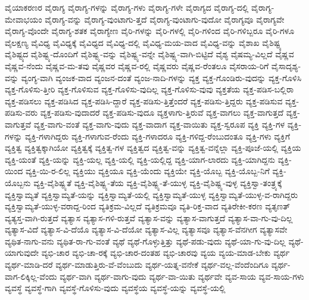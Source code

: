 {ವೈಯಾಕರಣರ
ವೈರಾಗ್ಯ
ವೈರಾಗ್ಯ-ಗಳನ್ನು
ವೈರಾಗ್ಯ-ಗಳು
ವೈರಾಗ್ಯ-ಗಳೇ
ವೈರಾಗ್ಯದ
ವೈರಾಗ್ಯ-ದಲ್ಲಿ
ವೈರಾಗ್ಯ-ಮೇವಾಭಯಂ
ವೈರಾಗ್ಯ-ವನ್ನು
ವೈರಾಗ್ಯ-ವುಂಟಾಗು-ತ್ತದೆ
ವೈರಾಗ್ಯ-ವುಂಟಾಗು-ವುದೋ
ವೈರಾಗ್ಯವೂ
ವೈರಾಗ್ಯವೇ
ವೈರಾಗ್ಯ-ವೊಂದೇ
ವೈರಾಗ್ಯ-ಶತಕ
ವೈರಾಗ್ಯೇಣ
ವೈರಿ-ಗಳನ್ನು
ವೈರಿ-ಗಳಲ್ಲಿ
ವೈರಿ-ಗಳಿಂದ
ವೈರಿ-ಗಳಿಬ್ಬರೂ
ವೈರಿ-ಗಳೂ
ವೈಲಕ್ಷಣ್ಯ
ವೈವಿಧ್ಯ
ವೈವಿಧ್ಯಕ್ಕೆ
ವೈವಿಧ್ಯದ
ವೈವಿಧ್ಯ-ದಲ್ಲಿ
ವೈವಿಧ್ಯ-ಮಯ-ವಾದ
ವೈವಿಧ್ಯ-ವನ್ನು
ವೈಶಾಖ
ವೈಶಿಷ್ಟ್ಯ
ವೈಶಿಷ್ಟ್ಯದ
ವೈಶಿಷ್ಟ್ಯ-ದೊಂದಿಗೆ
ವೈಶಿಷ್ಟ್ಯ-ವನ್ನು
ವೈಶಿಷ್ಟ್ಯ-ವನ್ನೇ
ವೈಶಿಷ್ಟ್ಯ-ವಾಗಿ-ಬಿಟ್ಟಿದೆ
ವೈಶ್ಯ
ವೈಷಮ್ಯ-ವಿಲ್ಲದೆ
ವೈಷ್ಣವ
ವೈಷ್ಣವ-ನೆಂದು
ವೈಷ್ಣವ-ಮ-ತವು
ವೈಷ್ಣವರ
ವೈಷ್ಣವ-ರಲ್ಲಿ
ವೈಷ್ಣವರು
ವೈಷ್ಣವ-ರೆಂತಲೂ
ವೈಸರಾಯ-ರಿಗೆ
ವೈಸಾದೃಶ್ಯ-ವನ್ನು
ವ್ಯಂಗ್ಯ-ವಾಗಿ
ವ್ಯಂಜಕ-ವಾದ
ವ್ಯಂಜನ-ದಂತೆ
ವ್ಯಂಜ-ನಾದಿ-ಗಳನ್ನು
ವ್ಯಕ್ತ
ವ್ಯಕ್ತ-ಗೊಂಡಿರು-ವುದನ್ನು
ವ್ಯಕ್ತ-ಗೊಳಿಸಿ
ವ್ಯಕ್ತ-ಗೊಳಿಸು-ತ್ತೀರಿ
ವ್ಯಕ್ತ-ಗೊಳಿಸುವ
ವ್ಯಕ್ತ-ಗೊಳಿಸು-ವುದಿಲ್ಲ
ವ್ಯಕ್ತ-ಗೊಳಿಸು-ವುವು
ವ್ಯಕ್ತತೆಯ
ವ್ಯಕ್ತ-ಪಡಿಸ-ಬಲ್ಲಿರಾ
ವ್ಯಕ್ತ-ಪಡಿಸಲು
ವ್ಯಕ್ತ-ಪಡಿಸಿದ
ವ್ಯಕ್ತ-ಪಡಿಸಿ-ದ್ದಾರೆ
ವ್ಯಕ್ತ-ಪಡಿಸು-ತ್ತಿತ್ತೆಂದರೆ
ವ್ಯಕ್ತ-ಪಡಿಸು-ತ್ತಿದ್ದರು
ವ್ಯಕ್ತ-ಪಡಿಸುವ
ವ್ಯಕ್ತ-ಪಡಿಸು-ವರು
ವ್ಯಕ್ತ-ಪಡಿಸು-ವುದಾದರೆ
ವ್ಯಕ್ತ-ಪಡಿಸು-ವುದೂ
ವ್ಯಕ್ತಳಾಗು-ತ್ತಿರುವೆ
ವ್ಯಕ್ತ-ವಾಗಲು
ವ್ಯಕ್ತ-ವಾಗುತ್ತದೆ
ವ್ಯಕ್ತ-ವಾಗುತ್ತವೆ
ವ್ಯಕ್ತ-ವಾಗು-ವಂತೆ
ವ್ಯಕ್ತ-ವಾಗು-ವುದು
ವ್ಯಕ್ತ-ವಾದಾಗ
ವ್ಯಕ್ತ-ವಾಯಿತು
ವ್ಯಕ್ತ-ಸ್ವರೂಪ
ವ್ಯಕ್ತಿ
ವ್ಯಕ್ತಿ-ಗಳ
ವ್ಯಕ್ತಿ-ಗಳನ್ನು
ವ್ಯಕ್ತಿ-ಗಳಾಗಿದ್ದರು
ವ್ಯಕ್ತಿ-ಗಳಾಗುವ-ರೆಂದು
ವ್ಯಕ್ತಿ-ಗಳಾದರೂ
ವ್ಯಕ್ತಿ-ಗಳಿದ್ದ-ರೆಂಬುದಂತೂ
ವ್ಯಕ್ತಿ-ಗಳು
ವ್ಯಕ್ತಿಗೆ
ವ್ಯಕ್ತಿತ್ವ
ವ್ಯಕ್ತಿತ್ವಕ್ಕಾಗಿಯೋ
ವ್ಯಕ್ತಿತ್ವಕ್ಕೆ
ವ್ಯಕ್ತಿತ್ವ-ಗಳ
ವ್ಯಕ್ತಿತ್ವದ
ವ್ಯಕ್ತಿತ್ವ-ವನ್ನು
ವ್ಯಕ್ತಿತ್ವ-ವನ್ನೆಲ್ಲಾ
ವ್ಯಕ್ತಿ-ಪೂಜೆ-ಯಲ್ಲಿ
ವ್ಯಕ್ತಿಯ
ವ್ಯಕ್ತಿ-ಯಂತೆ
ವ್ಯಕ್ತಿ-ಯನ್ನು
ವ್ಯಕ್ತಿ-ಯಲ್ಲ
ವ್ಯಕ್ತಿ-ಯಲ್ಲಿ
ವ್ಯಕ್ತಿ-ಯಲ್ಲಿದ್ದ
ವ್ಯಕ್ತಿ-ಯಾಗ-ಲಾರದು
ವ್ಯಕ್ತಿ-ಯಾಗಿದ್ದನು
ವ್ಯಕ್ತಿ-ಯಿಂದ
ವ್ಯಕ್ತಿ-ಯಿ-ರ-ಲಿಲ್ಲ
ವ್ಯಕ್ತಿಯು
ವ್ಯಕ್ತಿಯೂ
ವ್ಯಕ್ತಿ-ಯೆಂದು
ವ್ಯಕ್ತಿಯೇ
ವ್ಯಕ್ತಿ-ಯೊಬ್ಬ
ವ್ಯಕ್ತಿ-ಯೊಬ್ಬ-ನಿಗೆ
ವ್ಯಕ್ತಿ-ಯೊಬ್ಬನು
ವ್ಯಕ್ತಿ-ವೈಶಿಷ್ಟ್ಯತೆ
ವ್ಯಕ್ತಿ-ವೈಶಿಷ್ಟ್ಯ-ತೆಯ
ವ್ಯಕ್ತಿ-ವೈಶಿಷ್ಟ್ಯ-ತೆ-ಯುಳ್ಳ
ವ್ಯಕ್ತಿ-ವೈಶಿಷ್ಟ್ಯ-ವುಳ್ಳ
ವ್ಯಕ್ತಿಸ್ವಾ-ತಂತ್ರ್ಯಕ್ಕೆ
ವ್ಯಕ್ತಿಸ್ವಾಮ್ಯತೆ
ವ್ಯಕ್ತಿಸ್ವಾಮ್ಯತೆ-ಯನ್ನು
ವ್ಯಕ್ತಿಸ್ವಾಮ್ಯತೆ-ಯಲ್ಲಿ
ವ್ಯಕ್ತಿಸ್ವಾಮ್ಯತೆ-ಯುಳ್ಳ
ವ್ಯಕ್ತಿಸ್ವಾಮ್ಯತೆ-ಯುಳ್ಳ-ವ-ರಾಗಿದ್ದರು
ವ್ಯಕ್ತಿಸ್ವಾಮ್ಯತೆ-ಯುಳ್ಳ-ವರಾದ್ದ-ರಿಂದ
ವ್ಯತಿಕ್ರಮ-ವಿಲ್ಲದೆ
ವ್ಯತಿಕ್ರಮವೂ
ವ್ಯತಿ-ರಿಕ್ತ-ವಾದ
ವ್ಯತಿರೇಕೀ-ಕರಣ
ವ್ಯತೃಣತ್
ವ್ಯತ್ಯಸ್ತ-ವಾಗಿ-ರುತ್ತದೆ
ವ್ಯತ್ಯಾಸ
ವ್ಯತ್ಯಾಸ-ಗಳಿ-ರುತ್ತವೆ
ವ್ಯತ್ಯಾಸ-ವನ್ನು
ವ್ಯತ್ಯಾಸ-ವಾಗುತ್ತದೆ
ವ್ಯತ್ಯಾಸ-ವಾ-ಗು-ವು-ದಿಲ್ಲ
ವ್ಯತ್ಯಾಸ-ವಿದೆ
ವ್ಯತ್ಯಾಸ-ವಿ-ದೆಯೊ
ವ್ಯತ್ಯಾಸ-ವಿ-ದೆಯೋ
ವ್ಯತ್ಯಾಸ-ವಿಲ್ಲ
ವ್ಯತ್ಯಾಸವೂ
ವ್ಯತ್ಯಾಸ-ವೆನಗೀಗ
ವ್ಯತ್ಯಾಸವೇ
ವ್ಯಥಿತ-ನಾಗು-ವನು
ವ್ಯಥಿತ-ರಾ-ಗು-ವಂತೆ
ವ್ಯಥೆ
ವ್ಯಥೆ-ಗೊಳ್ಳುತ್ತಿತ್ತು
ವ್ಯಥೆ-ಪಡು-ವುದು
ವ್ಯಥೆ-ಯಾ-ಗು-ವು-ದಿಲ್ಲ
ವ್ಯಥೆ-ಯಾಗುವುದೇ
ವ್ಯಭಿ-ಚಾರ
ವ್ಯಭಿ-ಚಾ-ರಕ್ಕೆ
ವ್ಯಭಿ-ಚಾರ-ದಂತಹ
ವ್ಯಭಿ-ಚಾರವು
ವ್ಯಯ
ವ್ಯಯ-ಮಾಡ-ಬೇಕು
ವ್ಯರ್ಥ
ವ್ಯರ್ಥ-ಮಾಡಿ-ದರೆ
ವ್ಯರ್ಥ-ಮಾಡುತ್ತಿರು-ವೆ-ವೆಂಬುದು
ವ್ಯರ್ಥ-ಯತ್ನ-ವನೇಕೆ
ವ್ಯರ್ಥ-ವಲ್ಲ-ವೆಂದೆಂದಿಗೂ
ವ್ಯರ್ಥ-ವಾಗ-ಲಿಕ್ಕಿಲ್ಲ-ವೆಂದು
ವ್ಯರ್ಥ-ವಾಗಿ
ವ್ಯರ್ಥ-ವಾಗು-ವುದು
ವ್ಯರ್ಥ-ವಾ-ಯಿತು
ವ್ಯರ್ಥವೇ
ವ್ಯವ-ಸಾಯ
ವ್ಯವ-ಸಾಯ-ಗಳು
ವ್ಯವಸ್ಥೆ
ವ್ಯವಸ್ಥೆ-ಗಾಗಿ
ವ್ಯವಸ್ಥೆ-ಗೊಳಿಸು-ವುದು
ವ್ಯವಸ್ಥೆಯ
ವ್ಯವಸ್ಥೆ-ಯನ್ನು
ವ್ಯವಸ್ಥೆ-ಯಲ್ಲಿ
}
